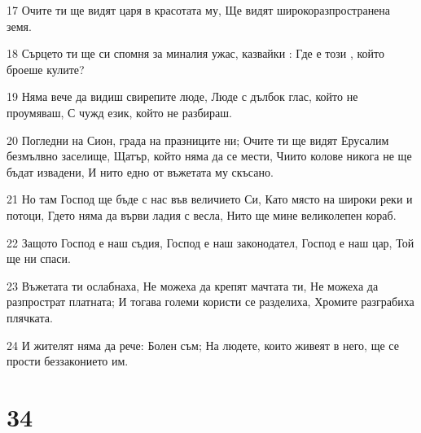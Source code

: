 \par 17 Очите ти ще видят царя в красотата му, Ще видят широкоразпространена земя.
\par 18 Сърцето ти ще си спомня за миналия ужас, казвайки : Где е този , който броеше кулите?
\par 19 Няма вече да видиш свирепите люде, Люде с дълбок глас, който не проумяваш, С чужд език, който не разбираш.
\par 20 Погледни на Сион, града на празниците ни; Очите ти ще видят Ерусалим безмълвно заселище, Щатър, който няма да се мести, Чиито колове никога не ще бъдат извадени, И нито едно от въжетата му скъсано.
\par 21 Но там Господ ще бъде с нас във величието Си, Като място на широки реки и потоци, Гдето няма да върви ладия с весла, Нито ще мине великолепен кораб.
\par 22 Защото Господ е наш съдия, Господ е наш законодател, Господ е наш цар, Той ще ни спаси.
\par 23 Въжетата ти ослабнаха, Не можеха да крепят мачтата ти, Не можеха да разпрострат платната; И тогава големи користи се разделиха, Хромите разграбиха плячката.
\par 24 И жителят няма да рече: Болен съм; На людете, които живеят в него, ще се прости беззаконието им.

\chapter{34}

